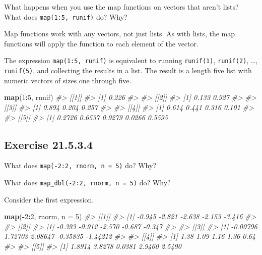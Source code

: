 \documentclass[]{book}
\newenvironment{Shaded}{\begin{snugshade}}{\end{snugshade}}
\newcommand{\CommentTok}[1]{\textcolor[rgb]{0.56,0.35,0.01}{\textit{#1}}}
\newcommand{\DataTypeTok}[1]{\textcolor[rgb]{0.13,0.29,0.53}{#1}}
\newcommand{\DecValTok}[1]{\textcolor[rgb]{0.00,0.00,0.81}{#1}}
\newcommand{\KeywordTok}[1]{\textcolor[rgb]{0.13,0.29,0.53}{\textbf{#1}}}
\newcommand{\NormalTok}[1]{#1}
\newcommand{\OperatorTok}[1]{\textcolor[rgb]{0.81,0.36,0.00}{\textbf{#1}}}
\theoremstyle{plain}
\theoremstyle{remark}
\begin{document}
What happens when you use the map functions on vectors that aren't
lists? What does \texttt{map(1:5,\ runif)} do? Why?

Map functions work with any vectors, not just lists. As with lists, the
map functions will apply the function to each element of the vector.

The expression \texttt{map(1:5,\ runif)} is equivalent to running
\texttt{runif(1)}, \texttt{runif(2)}, \ldots{}, \texttt{runif(5)}, and
collecting the results in a list. The result is a length five list with
numeric vectors of sizes one through five.

\begin{Shaded}
\begin{Highlighting}[]
\KeywordTok{map}\NormalTok{(}\DecValTok{1}\OperatorTok{:}\DecValTok{5}\NormalTok{, runif)}
\CommentTok{#> [[1]]}
\CommentTok{#> [1] 0.226}
\CommentTok{#> }
\CommentTok{#> [[2]]}
\CommentTok{#> [1] 0.133 0.927}
\CommentTok{#> }
\CommentTok{#> [[3]]}
\CommentTok{#> [1] 0.894 0.204 0.257}
\CommentTok{#> }
\CommentTok{#> [[4]]}
\CommentTok{#> [1] 0.614 0.441 0.316 0.101}
\CommentTok{#> }
\CommentTok{#> [[5]]}
\CommentTok{#> [1] 0.2726 0.6537 0.9279 0.0266 0.5595}
\end{Highlighting}
\end{Shaded}

\hypertarget{exercise-21.5.3.4}{%
\subsection*{\texorpdfstring{Exercise
{21.5.3.4}}{Exercise 21.5.3.4}}\label{exercise-21.5.3.4}}

What does \texttt{map(-2:2,\ rnorm,\ n\ =\ 5)} do? Why?

What does \texttt{map\_dbl(-2:2,\ rnorm,\ n\ =\ 5)} do? Why?

Consider the first expression.

\begin{Shaded}
\begin{Highlighting}[]
\KeywordTok{map}\NormalTok{(}\OperatorTok{-}\DecValTok{2}\OperatorTok{:}\DecValTok{2}\NormalTok{, rnorm, }\DataTypeTok{n =} \DecValTok{5}\NormalTok{)}
\CommentTok{#> [[1]]}
\CommentTok{#> [1] -0.945 -2.821 -2.638 -2.153 -3.416}
\CommentTok{#> }
\CommentTok{#> [[2]]}
\CommentTok{#> [1] -0.393 -0.912 -2.570 -0.687 -0.347}
\CommentTok{#> }
\CommentTok{#> [[3]]}
\CommentTok{#> [1] -0.00796  1.72703  2.08647 -0.35835 -1.44212}
\CommentTok{#> }
\CommentTok{#> [[4]]}
\CommentTok{#> [1] 1.38 1.09 1.16 1.36 0.64}
\CommentTok{#> }
\CommentTok{#> [[5]]}
\CommentTok{#> [1] 1.8914 3.8278 0.0381 2.9460 2.5490}
\end{Highlighting}
\end{Shaded}
\end{document}
